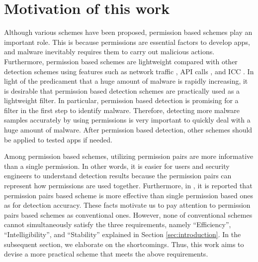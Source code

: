 \documentclass{ieeeaccess}
\begin{document}
\section{Motivation of this work} \label{sec:motivation}
Although various schemes have been proposed, permission based schemes play an important role.
This is because permissions are essential factors to develop apps, and malware inevitably requires them to carry out malicious actions.
Furthermore, permission based schemes \cite{sanz2013puma, li2018significant, liang2014permission, liu2014two, arora2019permpair} are lightweight compared with other detection schemes using features such as network traffic \cite{wang2018detecting,garg2017network}, API calls \cite{aafer2013droidapiminer, deshotels2014droidlegacy}, and ICC \cite{xu2016iccdetector, cai2018droidcat}.
In light of the predicament that a huge amount of malware is rapidly increasing, it is desirable that permission based detection schemes are practically used as a lightweight filter.
In particular, permission based detection is promising for a filter in the first step to identify malware.
Therefore, detecting more malware samples accurately by using permissions is very important to quickly deal with a huge amount of malware.
After permission based detection, other schemes should be applied to tested apps if needed.

Among permission based schemes, utilizing permission pairs are more informative than a single permission.
In other words, it is easier for users and security engineers to understand detection results because the permission pairs can represent how permissions are used together.
Furthermore, in \cite{arora2019permpair}, it is reported that permission pairs based scheme is more effective than single permission based ones as for detection accuracy.
These facts motivate us to pay attention to permission pairs based schemes \cite{liang2014permission, liu2014two, arora2019permpair} as conventional ones.
However, none of conventional schemes cannot simultaneously satisfy the three requirements, namely ``Efficiency'', ``Intelligibility'', and ``Stability'' explained in Section \ref{sec:introduction}.
In the subsequent section, we elaborate on the shortcomings.
Thus, this work aims to devise a more practical scheme that meets the above requirements.
\end{document}
